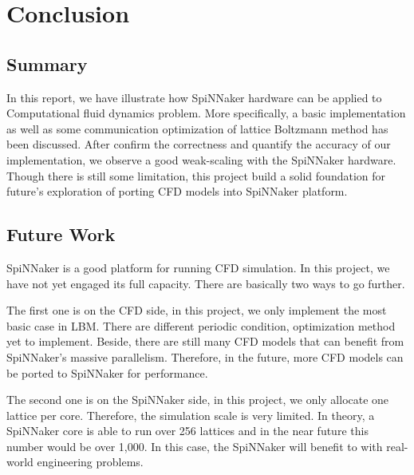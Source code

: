 \section{Conclusion} \label{sec:conclusion}
\subsection{Summary} \label{sec:summary}
In this report, we have illustrate how SpiNNaker hardware can be applied to Computational fluid dynamics problem. More specifically, a basic implementation as well as some communication optimization of lattice Boltzmann method has been discussed. After confirm the correctness and quantify the accuracy of our implementation, we observe a good weak-scaling with the SpiNNaker hardware. Though there is still some limitation, this project build a solid foundation for future's exploration of porting CFD models into SpiNNaker platform.


\subsection{Future Work} \label{sec:future_work}
SpiNNaker is a good platform for running CFD simulation. In this project, we have not yet engaged its full capacity. There are basically two ways to go further.

The first one is on the CFD side, in this project, we only implement the most basic case in LBM. There are different periodic condition, optimization method yet to implement. Beside, there are still many CFD models that can benefit from SpiNNaker's massive parallelism. Therefore, in the future, more CFD models can be ported to SpiNNaker for performance. 

The second one is on the SpiNNaker side, in this project, we only allocate one lattice per core. Therefore, the simulation scale is very limited. In theory, a SpiNNaker core is able to run over 256 lattices and in the near future this number would be over 1,000. In this case, the SpiNNaker will benefit to with real-world engineering problems.



